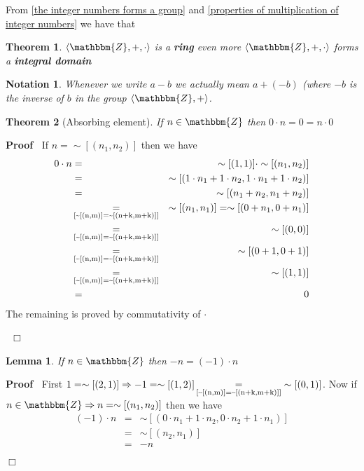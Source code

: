 \documentclass{book}
\newcommand{\equallim}{\mathop{=}\limits}
\newcommand{\noplus}{}
\newcommand{\tmstrong}[1]{\textbf{#1}}
\newcommand{\tmtextbf}[1]{{\bfseries{#1}}}
\newcommand{\um}{-}
\newcommand{\upl}{+}
\newenvironment{proof}{\noindent\textbf{Proof\ }}{\hspace*{\fill}$\Box$\medskip}
\newtheorem{lemma}{Lemma}
\newtheorem{notation}{Notation}
{\theorembodyfont{\rmfamily}\newtheorem{note}{Note}}
\newtheorem{theorem}{Theorem}
\begin{document}
{{From \ref{the integer numbers forms a group} and \ref{properties of
multiplication of integer numbers} we have that

\begin{theorem}
  \label{integer numbers form a ring}$\langle \mathbbm{Z}, +, \cdot \rangle$
  is a \tmtextbf{ring} even more $\langle \mathbbm{Z}, +, \cdot \rangle$ forms
  a {\tmstrong{integral domain}}
\end{theorem}

\begin{notation}
  Whenever we write $a \um b$ we actually mean $a \upl (\um b)$ (where $- b$
  is the inverse of $b$ in the group $\langle \mathbbm{Z}, \upl \rangle$.
\end{notation}

\begin{theorem}[Absorbing element]
  \label{absorbing element of the integers}{}If $n \in \mathbbm{Z}$ then $0 \cdot n = 0 = n \cdot 0$
\end{theorem}

\begin{proof}
  If $n = \sim [(n_1, n_2)]$ then we have
  \begin{eqnarray*}
    0 \cdot n & = & \sim [(1, 1)] \cdot \sim [(n_1, n_2)]\\
    & = & \sim [(1 \cdot n_1 \upl 1 \cdot n_2, 1 \cdot n_1 \noplus + 1 \cdot
    n_2)]\\
    & = & \sim [(n_1 \upl n_2, n_1 \upl n_2)]\\
    & \equallim_{\text{\ref{~[(n,m)]=~[(n+k,m+k)]}}} & \sim [(n_1, n_1)] =
    \sim [(0 \upl n_1, 0 \upl n_1)]\\
    & \equallim_{\text{\ref{~[(n,m)]=~[(n+k,m+k)]}}} & \sim [(0, 0)]\\
    & \equallim_{\text{\ref{~[(n,m)]=~[(n+k,m+k)]}}} & \sim [(0 \upl 1, 0
    \upl 1)]\\
    & \equallim_{\text{\ref{~[(n,m)]=~[(n+k,m+k)]}}} & \sim [(1, 1)]\\
    & = & 0
  \end{eqnarray*}
  The remaining is proved by commutativity of $\cdot$
  
  \ 
\end{proof}

\begin{lemma}
  \label{-n=(-1).n n is integer}If $n \in \mathbbm{Z}$ then $\um n = (\um 1)
  \cdot n$
\end{lemma}

\begin{proof}
  First $1 = \sim [(2, 1)] \Rightarrow \um 1 = \sim [(1, 2)]
  \equallim_{\text{\ref{~[(n,m)]=~[(n+k,m+k)]}}} \sim [(0, 1)]$. Now if $n \in
  \mathbbm{Z} \Rightarrow n = \sim [(n_1, n_2)]$ then we have
  \begin{eqnarray*}
    (\um 1) \cdot n & = & \sim [(0 \cdot n_1 \upl 1 \cdot n_2, 0 \cdot n_2
    \upl 1 \cdot n_1)]\\
    & = & \sim [(n_2, n_1)]\\
    & = & \um n
  \end{eqnarray*}
  

\end{proof}}}
\end{document}
